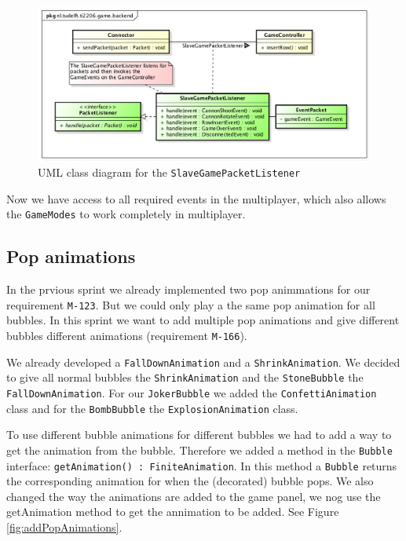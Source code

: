 \documentclass[a4paper]{article}
\begin{document}
\begin{figure}[H]
	\centering
	\includegraphics[scale=0.5]{SlaveGamePacketListener.png}
    \caption{UML class diagram for the \texttt{SlaveGamePacketListener} }
    \label{fig:slavegamepacketlistener}
\end{figure}

Now we have access to all required events in the multiplayer, which also allows the \texttt{GameModes} to work completely in multiplayer.


\subsection{Pop animations}
In the prvious sprint we already implemented two pop animmations for our requirement \texttt{M-123}. But we could only play a the same pop animation for all bubbles. In this sprint we want to add multiple pop animations and give different bubbles different animations (requirement \texttt{M-166}).

We already developed a \texttt{FallDownAnimation} and a \texttt{ShrinkAnimation}. We decided to give all normal bubbles the \texttt{ShrinkAnimation} and the \texttt{StoneBubble} the \texttt{FallDownAnimation}. For our \texttt{JokerBubble} we added the \texttt{ConfettiAnimation} class and for the \texttt{BombBubble} the \texttt{ExplosionAnimation} class.

To use different bubble animations for different bubbles we had to add a way to get the animation from the bubble. Therefore we added a method in the \texttt{Bubble} interface: \texttt{getAnimation() : FiniteAnimation}. In this method a \texttt{Bubble} returns the corresponding animation for when the (decorated) bubble pops. We also changed the way the animations are added to the game panel, we nog use the getAnimation method to get the annimation to be added. See Figure \ref{fig:addPopAnimations}.
\end{document}
